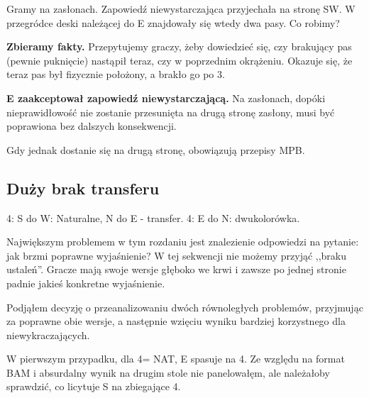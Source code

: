 \documentclass[12pt, a4paper]{article}
\newcounter{board}
\newcommand\nextboard{\stepcounter{board}\theboard}
\begin{document}
Gramy na zasłonach. Zapowiedź niewystarczająca przyjechała na 
stronę SW. W przegródce deski należącej do E znajdowały się wtedy dwa pasy.
Co robimy?

\textbf{Zbieramy fakty.}
Przepytujemy graczy, żeby dowiedzieć się, czy brakujący pas
(pewnie puknięcie) nastąpił teraz, czy w poprzednim okrążeniu.
Okazuje się, że teraz pas był fizycznie położony, a brakło go po 3\diams.

\textbf{E zaakceptował zapowiedź niewystarczającą.}
Na zasłonach, dopóki nieprawidłowość nie zostanie przesunięta na 
drugą stronę zasłony, musi być poprawiona bez dalszych konsekwencji.

Gdy jednak dostanie się na drugą stronę, obowiązują przepisy MPB.


\pagebreak
\subsection*{Duży brak transferu}

\handdiagramv[\nextboard]{\vhand{QT}{KQ5}{AT76}{A832}}
				{}
                {}
                {}{}


4\hearts: S do W: Naturalne, N do E - transfer.
4\spades: E do N: dwukolorówka.

Największym problemem w tym rozdaniu jest znalezienie odpowiedzi na
pytanie: jak brzmi poprawne wyjaśnienie? W tej sekwencji 
nie możemy przyjąć ,,braku ustaleń''. Gracze mają swoje wersje głęboko we krwi
i zawsze po jednej stronie padnie jakieś konkretne wyjaśnienie.

Podjąłem decyzję o przeanalizowaniu dwóch równoległych problemów,
przyjmując za poprawne obie wersje, a następnie wzięciu wyniku bardziej korzystnego
dla niewykraczających.

W pierwszym przypadku, dla 4\hearts = NAT, E spasuje na 4\spades.
Ze względu na format BAM i absurdalny wynik na drugim stole nie panelowałęm,
ale należałoby sprawdzić, co licytuje S na zbiegające 4\spades.
\end{document}
